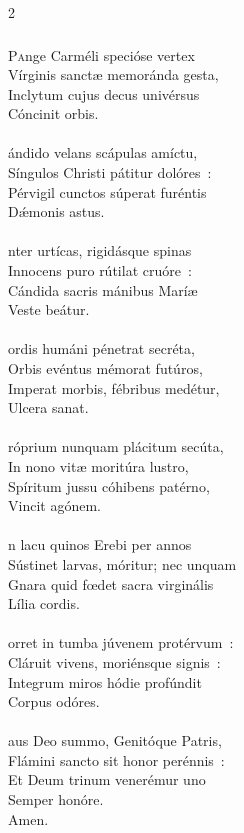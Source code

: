 \documentclass[9pt,twoside]{extarticle}
\begin{document}
\begin{multicols}{2}
{{{\subsubsection*{\center {}}
\lettrine{P}ange Carméli specióse vertex\\
Vírginis sanctæ memoránda gesta,\\
Inclytum cujus decus univérsus\\
Cóncinit orbis.\\
\\
ándido velans scápulas amíctu,\\
Síngulos Christi pátitur dolóres~:\\
Pérvigil cunctos súperat furéntis\\
Dǽmonis astus.\\
\\
nter urtícas, rigidásque spinas\\
Innocens puro rútilat cruóre~:\\
Cándida sacris mánibus Maríæ\\
Veste beátur.\\
\\
ordis humáni pénetrat secréta,\\
Orbis evéntus mémorat futúros,\\
Imperat morbis, fébribus medétur,\\
Ulcera sanat.\\
\\
róprium nunquam plácitum secúta,\\
In nono vitæ moritúra lustro,\\
Spíritum jussu cóhibens patérno,\\
Vincit agónem.\\
\\
n lacu quinos Erebi per annos\\
Sústinet larvas, móritur; nec unquam\\
Gnara quid fœdet sacra virginális\\
Lília cordis.\\
\\
orret in tumba júvenem protérvum~:\\
Cláruit vivens, moriénsque signis~:\\
Integrum miros hódie profúndit\\
Corpus odóres.\\
\\
aus Deo summo, Genitóque Patris,\\
Flámini sancto sit honor perénnis~:\\
Et Deum trinum venerémur uno\\
Semper honóre.\\
Amen.

}}}
\end{multicols}
\end{document}
